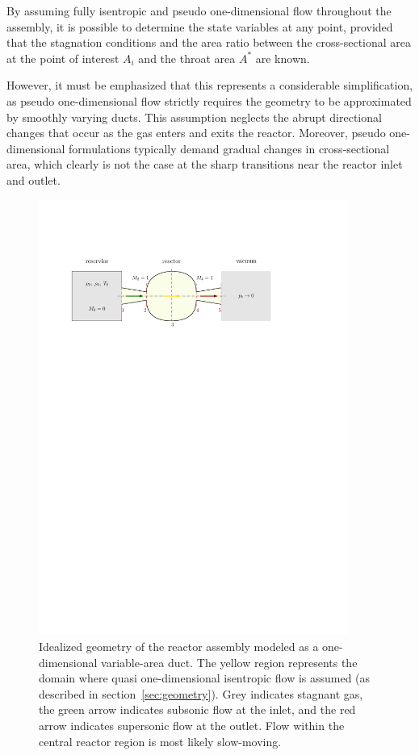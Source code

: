 By assuming fully isentropic and pseudo one-dimensional flow throughout the assembly, it is possible to determine the state variables at any point, provided that the stagnation conditions and the area ratio between the cross-sectional area at the point of interest $A_i$ and the throat area $A^*$ are known.

However, it must be emphasized that this represents a considerable simplification, as pseudo one-dimensional flow strictly requires the geometry to be approximated by smoothly varying ducts.
This assumption neglects the abrupt directional changes that occur as the gas enters and exits the reactor.
Moreover, pseudo one-dimensional formulations typically demand gradual changes in cross-sectional area, which clearly is not the case at the sharp transitions near the reactor inlet and outlet.
\cite{anderson2021modern}

\begin{figure}[H]
    \centering
    \includegraphics[width=0.9\textwidth]{src/03_analytical-work/fig_1d-flow-geometry}
    \caption{
        Idealized geometry of the reactor assembly modeled as a one-dimensional variable-area duct.
        The yellow region represents the domain where quasi one-dimensional isentropic flow is assumed (as described in section~\ref{sec:geometry}).
        Grey indicates stagnant gas, the green arrow indicates subsonic flow at the inlet, and the red arrow indicates supersonic flow at the outlet.
        Flow within the central reactor region is most likely slow-moving.
    }
\end{figure}

